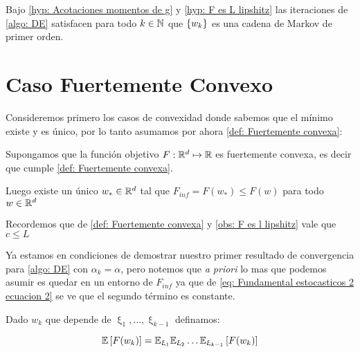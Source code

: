 \begin{corollary}
	\label{coro: DE es una cadena de markov}
	Bajo \ref{hyp: Acotaciones momentos de g} y \ref{hyp: F es L lipshitz} las iteraciones de \ref{algo: DE} satisfacen para todo $k \in {\mathbb{N}}$ que $\left\lbrace w_k\right\rbrace$ es una cadena de Markov de primer orden.
\end{corollary}

\section{Caso Fuertemente Convexo}
Consideremos primero los casos de convexidad donde sabemos que el m\'inimo existe y es \'unico, por lo tanto asumamos por ahora \ref{def: Fuertemente convexa}:

\begin{hyp}
	Supongamos que la funci\'on objetivo $F : {\mathbb{R}}^d \mapsto {\mathbb{R}}$ es fuertemente convexa, es decir que cumple \ref{def: Fuertemente convexa}.
	
	Luego existe un \'unico $w_{*} \in {\mathbb{R}}^d$ tal que $F_{inf} = F(w_*) \leq F(w)$ para todo $w \in {\mathbb{R}}^d$
	
\end{hyp}

Recordemos que de \ref{def: Fuertemente convexa} y \ref{obs: F es l lipshitz} vale que $c \leq L$ 

Ya estamos en condiciones de demostrar nuestro primer resultado de convergencia para \ref{algo: DE} con $\alpha_k = \alpha$, pero notemos que \textit{a priori} lo mas que podemos asumir es quedar en un entorno de $F_{inf}$ ya que de \ref{eq: Fundamental estocasticos 2 ecuacion 2} se ve que el segundo t\'ermino es constante.

Dado $w_k$ que depende de $\upxi_{1}, \dots, \upxi_{k-1}$ definamos:

\begin{equation*}
	\label{def: esperanza total}
	\mathbb{E} \left[F(w_k)\right] = \mathbb{E}_{\upxi_{1}}\mathbb{E}_{\upxi_{2}}\dots \mathbb{E}_{\upxi_{k-1}}\left[F(w_k)\right]
\end{equation*}

